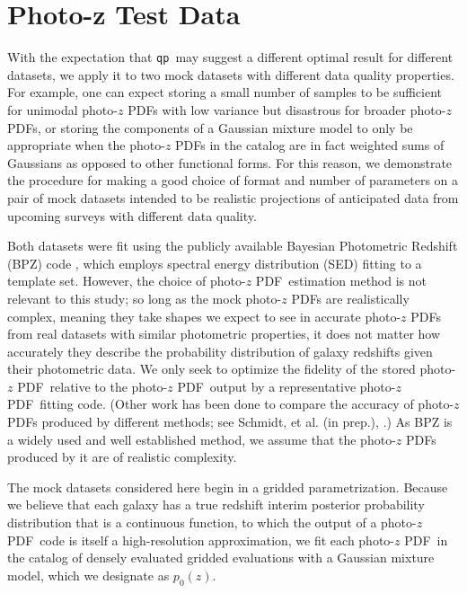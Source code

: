 \documentclass[\docopts]{\docclass}
\newcommand{\qp}{\texttt{qp}}
\newcommand{\pz}{photo-$z$ PDF}
\begin{document}


\section{Photo-z Test Data}
\label{sec:data}

With the expectation that \qp\  may suggest a different optimal result for 
different datasets, we apply it to two mock datasets with different data 
quality properties.  For example, one can expect storing a small number of 
samples to be sufficient for unimodal \pz s with low variance but disastrous 
for broader \pz s, or storing the components of a Gaussian mixture model to 
only be appropriate when the \pz s in the catalog are in fact weighted sums of 
Gaussians as opposed to other functional forms.  For this reason, we 
demonstrate the procedure for making a good choice of format and number of 
parameters on a pair of mock datasets intended to be realistic projections of 
anticipated data from upcoming surveys with different data quality.

Both datasets were fit using the publicly available Bayesian Photometric 
Redshift (BPZ) code \citep{benitez_bayesian_2000}, which employs spectral 
energy distribution (SED) fitting to a template set.  However, the choice of 
\pz\ estimation method is not relevant to this study; so long as the mock \pz s 
are realistically complex, meaning they take shapes we expect to see in 
accurate \pz s from real datasets with similar photometric properties, it does 
not matter how accurately they describe the probability distribution of galaxy 
redshifts given their photometric data.  We only seek to optimize the fidelity 
of the stored \pz\ relative to the \pz\ output by a representative \pz\ fitting 
code.  (Other work has been done to compare the accuracy of \pz s produced by 
different methods; see Schmidt, et al. (in prep.), 
\citet{tanaka_photometric_2017}.)  As BPZ is a widely used and well established 
method, we assume that the \pz s produced by it are of realistic complexity.

The mock datasets considered here begin in a gridded parametrization.  Because 
we believe that each galaxy has a true redshift interim posterior probability 
distribution that is a continuous function, to which the output of a \pz\ code 
is itself a high-resolution approximation, we fit each \pz\ in the catalog of 
densely evaluated gridded evaluations with a Gaussian mixture model, which we 
designate as $p_{0}(z)$.
\end{document}

